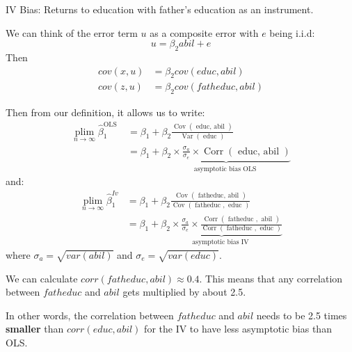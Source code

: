 \documentclass[11pt]{article}
\begin{document}
\begin{example}
    IV Bias: Returns to education with father's education as an instrument.

    We can think of the error term $u$ as a composite error with $e$ being i.i.d:
    \[u = \beta_2 abil + e\]
    Then 
    \begin{align*}
        cov(x,u)&= \beta_2 cov(educ,abil) \\
        cov(z,u) &= \beta_2 cov(fatheduc,abil)
    \end{align*}

    Then from our definition, it allows us to write:
    \begin{equation}
\begin{aligned}
\underset{n \rightarrow \infty}{\operatorname{plim}}
 \hat{\beta}_1^{\text {OLS }} & =\beta_1+\beta_2 \frac{\operatorname{Cov}(\text { educ, abil })}{\operatorname{Var}(\text { educ })} \\
& =\beta_1+\underbrace{\beta_2 \times \frac{\sigma_a}{\sigma_e} \times \operatorname{Corr}(\text { educ, abil })}_{\text {asymptotic bias OLS }}
\end{aligned}
\end{equation}
and:
\begin{equation}
\begin{aligned}
\underset{n \rightarrow \infty}{\operatorname{plim}} \hat{\beta}_1^{I v} & =\beta_1+\beta_2 \frac{\operatorname{Cov}(\text { fatheduc, abil })}{\operatorname{Cov}(\text { fatheduc }, \text { educ })} \\
& =\beta_1+\underbrace{\beta_2 \times \frac{\sigma_a}{\sigma_e} \times \frac{\operatorname{Corr}(\text { fatheduc }, \text { abil })}{\operatorname{Corr}(\text { fatheduc }, \text { educ })}}_{\text {asymptotic bias IV }}
\end{aligned}
\end{equation}
where $\sigma_a = \sqrt{var(abil)}$ and $\sigma_e = \sqrt{var(educ)}$.

We can calculate $corr(fatheduc,abil) \approx 0.4$. This means that any correlation between $fatheduc$ and $abil$ gets multiplied by about 2.5.

In other words, the correlation between $fatheduc$ and $abil$ needs to be 2.5 times \textbf{smaller} than $corr(educ,abil)$ for the IV to have less asymptotic bias than OLS.
\end{example}
\end{document}
